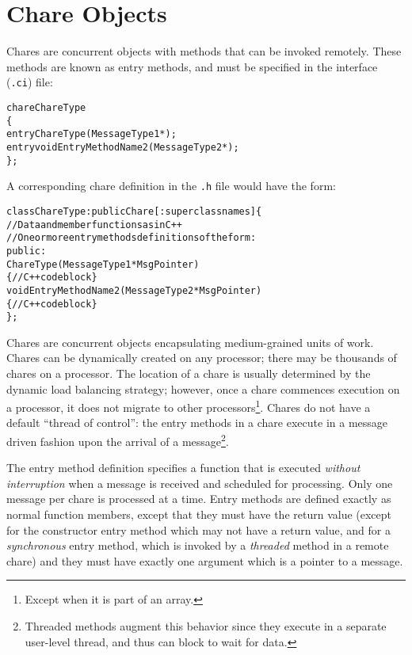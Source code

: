 \section{Chare Objects}

Chares are concurrent objects with methods that can be invoked
remotely.  These methods are known as entry methods, and 
must be specified in the interface (\texttt{.ci}) file:

\begin{alltt}
chare ChareType
\{
    entry   ChareType             (MessageType1 *);
    entry   void EntryMethodName2 (MessageType2 *);
\};
\end{alltt}

A corresponding chare definition in the \texttt{.h} file would 
have the form:

\begin{alltt}
   class ChareType : public Chare [: superclass names] \{   
        // Data and member functions as in C++ 
        // One or more entry methods definitions of the form: 
   public: 
      ChareType(MessageType1 *MsgPointer) 
         \{ // C++ code block  \} 
      void EntryMethodName2(MessageType2 *MsgPointer) 
         \{ // C++ code block  \} 
   \};
\end{alltt}

Chares are concurrent objects encapsulating medium-grained units of
work.  Chares can be dynamically created on any processor; there may
be thousands of chares on a processor. The location of a chare is
usually determined by the dynamic load balancing strategy; however,
once a chare commences execution on a processor, it does not migrate
to other processors\footnote{Except when it is part of an array.}.  
Chares do not have a default ``thread of
control'': the entry methods  in a
chare execute in a message driven fashion upon the arrival of a 
message\footnote{Threaded methods augment this behavior since they execute in
a separate user-level thread, and thus can block to wait for data.}.

The entry method definition specifies a function that is executed {\em
without interruption} when a message is received and scheduled for
processing. Only one message per chare is processed at a time.  Entry
methods are defined exactly as normal \CC{} function members, except
that they must have the return value  (except for the
constructor entry method which may not have a return value, and for a 
{\em synchronous} entry method, which is invoked by a {\em threaded} 
method in a remote chare) and they
must have exactly one argument which is a pointer to a message.

